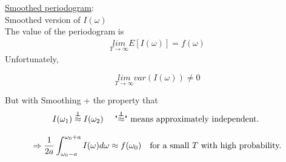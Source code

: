 \underline{Smoothed periodogram}:  \\

Smoothed version of $I(\omega)$\\

The value of the periodogram is 
\begin{align*}
    \underset{T\rightarrow\infty}{lim} E\left[I(\omega) \right] = f(\omega)
\end{align*}
Unfortunately, 

\[\underset{T \rightarrow \infty}{lim} var(I(\omega)) \neq 0 \]

But with Smoothing + the property that 
\[I(\omega_1) \overset{\ind}{\approx} I(\omega_2) \text{
\quad "$\overset{\ind}{\approx}$" means approximately independent. 
} \]


\[\Rightarrow \frac{1}{2a} \int_{\omega_0 - a}^{\omega_0 + a} I(\omega)d\omega \approx f(\omega_0) \text{\quad for a small $T$ with high probability.}\]
